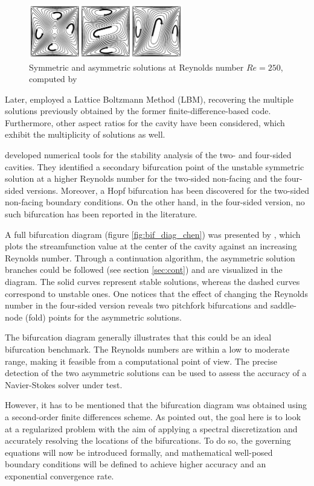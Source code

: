 \begin{figure}[ht]
  \centering
  \includegraphics[width=0.6\textwidth]{figs/fig1_chen2013}
  \caption{Symmetric and asymmetric solutions at Reynolds number $Re=250$,
    computed by \cite{chen2013}}
  \label{fig:4fsc_states}
\end{figure}

Later, \cite{perumal2011} employed a Lattice Boltzmann Method (LBM), recovering
the multiple solutions previously obtained by the former
finite-difference-based code. Furthermore, other aspect ratios for the cavity
have been considered, which exhibit the multiplicity of solutions as well. 

\cite{cadou2012} developed numerical tools for the stability analysis of the
two- and four-sided cavities. They identified a secondary bifurcation point of
the unstable symmetric solution at a higher Reynolds number for the two-sided
non-facing and the four-sided versions. Moreover, a Hopf bifurcation has been
discovered for the two-sided non-facing boundary conditions. On the other hand,
in the four-sided version, no such bifurcation has been reported in the
literature.

A full bifurcation diagram (figure \ref{fig:bif_diag_chen}) was presented by
\cite{chen2013}, which plots the streamfunction value at the center of the
cavity against an increasing Reynolds number. Through a continuation algorithm,
the asymmetric solution branches could be followed (see section \ref{sec:cont})
and are visualized in the diagram. The solid curves represent stable solutions,
whereas the dashed curves correspond to unstable ones. One notices that the
effect of changing the Reynolds number in the four-sided version reveals two
pitchfork bifurcations and saddle-node (fold) points for the asymmetric
solutions.

The bifurcation diagram generally illustrates that this could be an ideal
bifurcation benchmark. The Reynolds numbers are within a low to moderate range,
making it feasible from a computational point of view. The precise detection of
the two asymmetric solutions can be used to assess the accuracy of a
Navier-Stokes solver under test.

However, it has to be mentioned that the bifurcation diagram was obtained using
a second-order finite differences scheme. As pointed out, the goal here is to
look at a regularized problem with the aim of applying a spectral
discretization and accurately resolving the locations of the bifurcations. To
do so, the governing equations will now be introduced formally, and
mathematical well-posed boundary conditions will be defined to achieve higher
accuracy and an exponential convergence rate.

